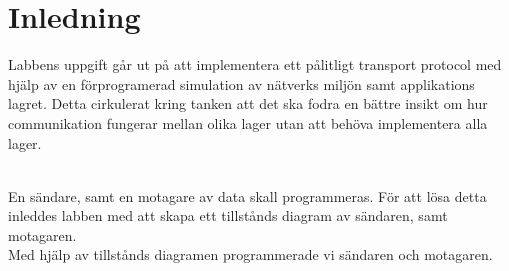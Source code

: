 \section{Inledning}

Labbens uppgift går ut på att implementera ett pålitligt transport protocol med hjälp av en
förprogramerad simulation av nätverks miljön samt applikations lagret. Detta cirkulerat kring
tanken att det ska fodra en bättre insikt om hur communikation fungerar mellan olika lager utan
att behöva implementera alla lager. 

\\ En sändare, samt en motagare av data skall programmeras. För att lösa detta inleddes
labben med att skapa ett tillstånds diagram av sändaren, samt motagaren.
\\ Med hjälp av tillstånds diagramen programmerade vi sändaren och motagaren.

